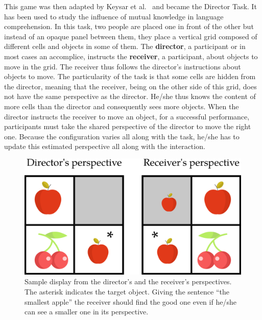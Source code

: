 This game was then adapted by Keysar et al.~\cite{keysar_2000_taking} and became the Director Task. It has been used to study the influence of mutual knowledge in language comprehension. In this task, two people are placed one in front of the other but instead of an opaque panel between them, they place a vertical grid composed of different cells and objects in some of them. The \textbf{director}, a participant or in most cases an accomplice, instructs the \textbf{receiver}, a participant, about objects to move in the grid. The receiver thus follows the director's instructions about objects to move. The particularity of the task is that some cells are hidden from the director, meaning that the receiver, being on the other side of this grid, does not have the same perspective as the director. He/she thus knows the content of more cells than the director and consequently sees more objects. When the director instructs the receiver to move an object, for a successful performance, participants must take the shared perspective of the director to move the right one. Because the configuration varies all along with the task, he/she has to update this estimated perspective all along with the interaction.

\begin{figure}[ht!]
\centering
\includegraphics[scale=0.25]{figures/chapter9/dt_apple.png}
\caption{\label{fig:chap9_dt_apple} Sample display from the director's and the receiver's perspectives. The asterisk indicates the target object. Giving the sentence ``the smallest apple'' the receiver should find the good one even if he/she can see a smaller one in its perspective. }
\end{figure}


